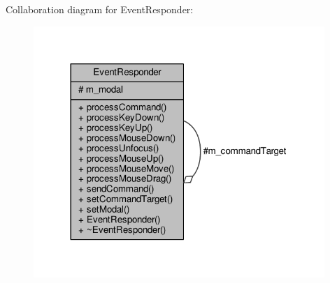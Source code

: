 Collaboration diagram for Event\+Responder\+:
\nopagebreak
\begin{figure}[H]
\begin{center}
\leavevmode
\includegraphics[width=312pt]{d1/d5e/classEventResponder__coll__graph}
\end{center}
\end{figure}
